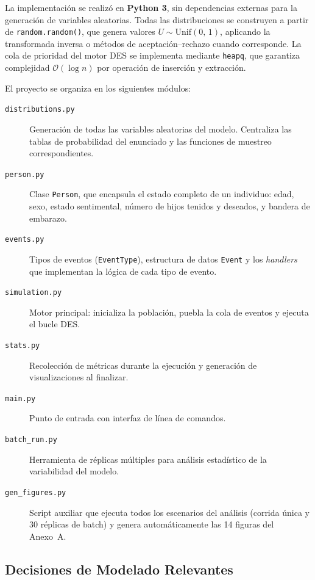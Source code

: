 \documentclass[12pt, a4paper]{article}
\newcommand{\Unif}[2]{\mathrm{Unif}\!\left(#1,\,#2\right)}
\newcommand{\code}[1]{\texttt{#1}}
\begin{document}
La implementación se realizó en \textbf{Python 3}, sin dependencias externas
para la generación de variables aleatorias. Todas las distribuciones se
construyen a partir de \code{random.random()}, que genera valores
$U \sim \Unif{0}{1}$, aplicando la transformada inversa o métodos de
aceptación--rechazo cuando corresponde. La cola de prioridad del motor DES
se implementa mediante \code{heapq}, que garantiza complejidad
$\mathcal{O}(\log n)$ por operación de inserción y extracción.

El proyecto se organiza en los siguientes módulos:

\begin{description}
  \item[\code{distributions.py}] Generación de todas las variables
        aleatorias del modelo. Centraliza las tablas de probabilidad del
        enunciado y las funciones de muestreo correspondientes.
  \item[\code{person.py}] Clase \code{Person}, que encapsula el estado
        completo de un individuo: edad, sexo, estado sentimental, número de
        hijos tenidos y deseados, y bandera de embarazo.
  \item[\code{events.py}] Tipos de eventos (\code{EventType}), estructura
        de datos \code{Event} y los \textit{handlers} que implementan la
        lógica de cada tipo de evento.
  \item[\code{simulation.py}] Motor principal: inicializa la población,
        puebla la cola de eventos y ejecuta el bucle DES.
  \item[\code{stats.py}] Recolección de métricas durante la ejecución y
        generación de visualizaciones al finalizar.
  \item[\code{main.py}] Punto de entrada con interfaz de línea de comandos.
  \item[\code{batch\_run.py}] Herramienta de réplicas múltiples para análisis
        estadístico de la variabilidad del modelo.
  \item[\code{gen\_figures.py}] Script auxiliar que ejecuta todos los escenarios
        del análisis (corrida única y 30 réplicas de batch) y genera
        automáticamente las 14 figuras del Anexo~A.
\end{description}

\subsection{Decisiones de Modelado Relevantes}
\end{document}
